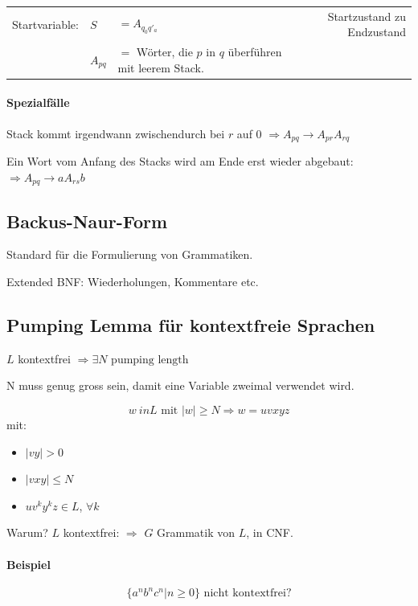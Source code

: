 \begin{tabular}{l l l r}
	Startvariable: & $S$&$=A_{q_0 q'_a}$ &Startzustand zu Endzustand \\
	& $A_{pq}$&$= $ Wörter, die $p$ in $q$ überführen mit leerem Stack.
\end{tabular}

\paragraph{Spezialfälle}

Stack kommt irgendwann zwischendurch bei $r$ auf 0 $\Rightarrow A_{pq} \to A_{pr} A_{rq}$

Ein Wort vom Anfang des Stacks wird am Ende erst wieder abgebaut: $\Rightarrow A_{pq} \to a A_{rs} b$

\subsection{Backus-Naur-Form}

Standard für die Formulierung von Grammatiken.

Extended BNF: Wiederholungen, Kommentare etc.


\subsection{Pumping Lemma für kontextfreie Sprachen}

$L$ kontextfrei $\Rightarrow \exists N \text{ pumping length }$

N muss genug gross sein, damit eine Variable zweimal verwendet wird.

\[
	w \ in L \text{ mit } |w| \geq N \Rightarrow w = uvxyz
\]
mit:
\begin{itemize}
	\item $|vy| > 0$
	\item $|vxy | \leq N$
	\item $uv^ky^kz \in L$, $\forall k$
\end{itemize}

Warum? $L$ kontextfrei: $\Rightarrow$ $G$ Grammatik von $L$, in CNF.




\paragraph{Beispiel}

\[
	\{a^n b^n c^n | n \geq 0 \} \text{ nicht kontextfrei?}
\]

